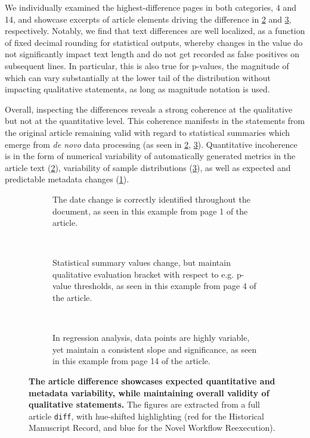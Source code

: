 We individually examined the highest-difference pages in both categories, 4 and 14, and showcase excerpts of article elements driving the difference in \cref{fig:diff_text} and \cref{fig:diff_fig}, respectively.
Notably, we find that text differences are well localized, as a function of fixed decimal rounding for statistical outputs, whereby changes in the value do not significantly impact text length and do not get recorded as false positives on subsequent lines.
In particular, this is also true for p-values, the magnitude of which can vary substantially at the lower tail of the distribution without impacting qualitative statements, as long as magnitude notation is used.


Overall, inspecting the differences reveals a strong coherence at the qualitative but not at the quantitative level.
This coherence manifests in the statements from the original article remaining valid with regard to statistical summaries which emerge from  \textit{de novo} data processing (as seen in \ref{fig:diff_text}, \ref{fig:diff_fig}).
Quantitative incoherence is in the form of numerical variability of automatically generated metrics in the article text (\ref{fig:diff_text}), variability of sample distributions (\ref{fig:diff_fig}), as well as expected and predictable metadata changes (\ref{fig:diff_date}).


\begin{figure}
	\centering
	\begin{subfigure}{0.99\textwidth}
		\centering
		\caption{
			The date change is correctly identified throughout the document, as seen in this example from page 1 of the article.
		}
		\label{fig:diff_date}
	\end{subfigure}
	\\
	\begin{subfigure}{0.99\textwidth}
		\centering
		\caption{
			Statistical summary values change, but maintain qualitative evaluation bracket with respect to e.g. p-value thresholds, as seen in this example from page 4 of the article.
		}
		\label{fig:diff_text}
	\end{subfigure}
	\\
	\vspace{1em}
	\begin{subfigure}{0.99\textwidth}
		\centering
		\caption{
			In regression analysis, data points are highly variable, yet maintain a consistent slope and significance, as seen in this example from page 14 of the article.
		}
		\label{fig:diff_fig}
	\end{subfigure}
	\caption{
		\textbf{The article difference showcases expected quantitative and metadata variability, while maintaining overall validity of qualitative statements.}
		The figures are extracted from a full article \texttt{diff}, with hue-shifted highlighting (red for the Historical Manuscript Record, and blue for the Novel Workflow Reexecution).
	}
	\label{fig:diff}
\end{figure}



